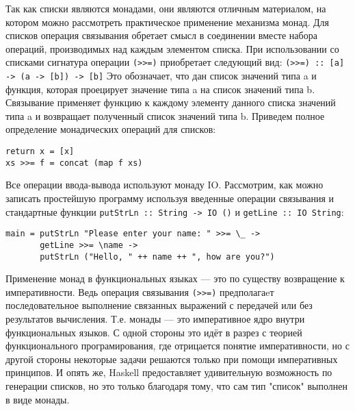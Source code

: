 Так как списки являются монадами, они являются отличным материалом, на котором
можно рассмотреть практическое применение механизма монад.
Для списков операция связывания обретает смысл в соединении вместе
набора операций, производимых над каждым элементом списка. При
использовании со списками сигнатура операции \verb|(>>=)| приобретает
следующий вид: \verb|(>>=) :: [a] -> (a -> [b]) -> [b]|
Это обозначает, что дан список значений типа a и функция, которая
проецирует значение типа a на список значений типа b. Связывание
применяет функцию к каждому элементу данного списка значений типа a и
возвращает полученный список значений типа b. Приведем полное
определение монадических операций для списков:
\begin{verbatim}
return x = [x]
xs >>= f = concat (map f xs)
\end{verbatim}

Все операции ввода-вывода используют монаду IO. Рассмотрим, как можно
записать простейшую программу используя введенные операции связывания
и стандартные функции \verb|putStrLn :: String -> IO ()| и
\verb|getLine :: IO String|:
\begin{verbatim}
main = putStrLn "Please enter your name: " >>= \_ ->
       getLine >>= \name ->
       putStrLn ("Hello, " ++ name ++ ", how are you?")
\end{verbatim}

Применение монад в функциональных языках — это по существу возвращение
к императивности. Ведь операция связывания \verb|(>>=)| предполагаeт
последовательное выполнение связанных выражений с передачей или без
результатов вычисления. Т.е. монады — это императивное ядро внутри
функциональных языков. С одной стороны это идёт в разрез с теорией
функционального програмирования, где отрицается понятие
императивности, но с другой стороны некоторые задачи решаются только
при помощи императивных принципов. И опять же, Haskell предоставляет
удивительную возможность по генерации списков, но это только благодаря
тому, что сам тип "список" выполнен в виде монады.


